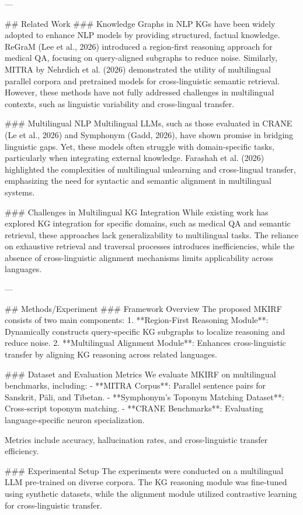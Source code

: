 ---

## Related Work
### Knowledge Graphs in NLP
KGs have been widely adopted to enhance NLP models by providing structured, factual knowledge. ReGraM (Lee et al., 2026) introduced a region-first reasoning approach for medical QA, focusing on query-aligned subgraphs to reduce noise. Similarly, MITRA by Nehrdich et al. (2026) demonstrated the utility of multilingual parallel corpora and pretrained models for cross-linguistic semantic retrieval. However, these methods have not fully addressed challenges in multilingual contexts, such as linguistic variability and cross-lingual transfer.

### Multilingual NLP
Multilingual LLMs, such as those evaluated in CRANE (Le et al., 2026) and Symphonym (Gadd, 2026), have shown promise in bridging linguistic gaps. Yet, these models often struggle with domain-specific tasks, particularly when integrating external knowledge. Farashah et al. (2026) highlighted the complexities of multilingual unlearning and cross-lingual transfer, emphasizing the need for syntactic and semantic alignment in multilingual systems.

### Challenges in Multilingual KG Integration
While existing work has explored KG integration for specific domains, such as medical QA and semantic retrieval, these approaches lack generalizability to multilingual tasks. The reliance on exhaustive retrieval and traversal processes introduces inefficiencies, while the absence of cross-linguistic alignment mechanisms limits applicability across languages.

---

## Methods/Experiment
### Framework Overview
The proposed MKIRF consists of two main components:
1. **Region-First Reasoning Module**: Dynamically constructs query-specific KG subgraphs to localize reasoning and reduce noise.
2. **Multilingual Alignment Module**: Enhances cross-linguistic transfer by aligning KG reasoning across related languages.

### Dataset and Evaluation Metrics
We evaluate MKIRF on multilingual benchmarks, including:
- **MITRA Corpus**: Parallel sentence pairs for Sanskrit, Pāli, and Tibetan.
- **Symphonym’s Toponym Matching Dataset**: Cross-script toponym matching.
- **CRANE Benchmarks**: Evaluating language-specific neuron specialization.

Metrics include accuracy, hallucination rates, and cross-linguistic transfer efficiency.

### Experimental Setup
The experiments were conducted on a multilingual LLM pre-trained on diverse corpora. The KG reasoning module was fine-tuned using synthetic datasets, while the alignment module utilized contrastive learning for cross-linguistic transfer.

